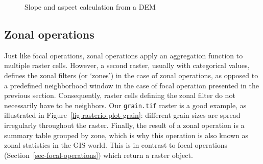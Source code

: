 \documentclass[
  letterpaper,
]{krantz}
\begin{document}
\begin{figure}

\begin{minipage}{0.33\linewidth}



\end{minipage}%
%
\begin{minipage}{0.33\linewidth}



\end{minipage}%
%
\begin{minipage}{0.33\linewidth}



\end{minipage}%

\caption{\label{fig-raster-slope}Slope and aspect calculation from a
DEM}

\end{figure}%

\subsection{Zonal operations}\label{sec-zonal-operations}

Just like focal operations, zonal operations apply an aggregation
function to multiple raster cells. However, a second raster, usually
with categorical values, defines the zonal filters (or `zones') in the
case of zonal operations, as opposed to a predefined neighborhood window
in the case of focal operation presented in the previous section.
Consequently, raster cells defining the zonal filter do not necessarily
have to be neighbors. Our \texttt{grain.tif} raster is a good example,
as illustrated in Figure~\ref{fig-rasterio-plot-grain}: different grain
sizes are spread irregularly throughout the raster. Finally, the result
of a zonal operation is a summary table grouped by zone, which is why
this operation is also known as zonal statistics in the GIS world. This
is in contrast to focal operations (Section~\ref{sec-focal-operations})
which return a raster object.
\end{document}
